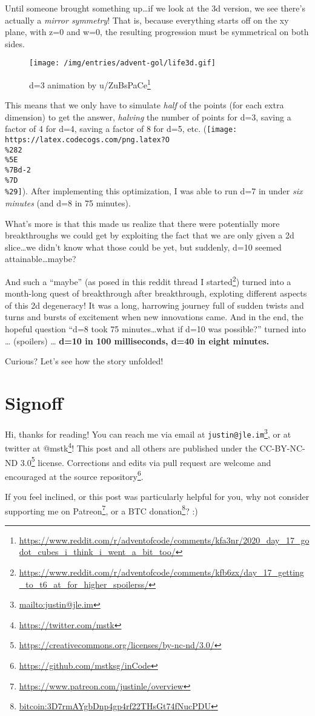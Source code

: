\documentclass[]{article}
\renewcommand{\href}[2]{#2\footnote{\url{#1}}}
\begin{document}
Until someone brought something up\ldots if we look at the 3d version, we see
there's actually a \emph{mirror symmetry}! That is, because everything starts
off on the xy plane, with z=0 and w=0, the resulting progression must be
symmetrical on both sides.

\begin{figure}
\centering
\texttt{[image: /img/entries/advent-gol/life3d.gif]}
\caption{d=3 animation by
\href{https://www.reddit.com/r/adventofcode/comments/kfa3nr/2020_day_17_godot_cubes_i_think_i_went_a_bit_too/}{u/ZuBsPaCe}}
\end{figure}

This means that we only have to simulate \emph{half} of the points (for each
extra dimension) to get the answer, \emph{halving} the number of points for d=3,
saving a factor of 4 for d=4, saving a factor of 8 for d=5, etc.
(\texttt{[image: https://latex.codecogs.com/png.latex?O\\\%282\\\%5E\\\%7Bd-2\\\%7D\\\%29]}).
After implementing this optimization, I was able to run d=7 in under \emph{six
minutes} (and d=8 in 75 minutes).

What's more is that this made us realize that there were potentially more
breakthroughs we could get by exploiting the fact that we are only given a 2d
slice\ldots we didn't know what those could be yet, but suddenly, d=10 seemed
attainable\ldots maybe?

And such a ``maybe'' (as posed in
\href{https://www.reddit.com/r/adventofcode/comments/kfb6zx/day_17_getting_to_t6_at_for_higher_spoilerss/}{this
reddit thread I started}) turned into a month-long quest of breakthrough after
breakthrough, exploting different aspects of this 2d degeneracy! It was a long,
harrowing journey full of sudden twists and turns and bursts of excitement when
new innovations came. And in the end, the hopeful question ``d=8 took 75
minutes\ldots what if d=10 was possible?'' turned into \ldots{} (spoilers)
\ldots{} \textbf{d=10 in 100 milliseconds, d=40 in eight minutes.}

Curious? Let's see how the story unfolded!

\hypertarget{signoff}{%
\section{Signoff}\label{signoff}}

Hi, thanks for reading! You can reach me via email at
\href{mailto:justin@jle.im}{\nolinkurl{justin@jle.im}}, or at twitter at
\href{https://twitter.com/mstk}{@mstk}! This post and all others are published
under the \href{https://creativecommons.org/licenses/by-nc-nd/3.0/}{CC-BY-NC-ND
3.0} license. Corrections and edits via pull request are welcome and encouraged
at \href{https://github.com/mstksg/inCode}{the source repository}.

If you feel inclined, or this post was particularly helpful for you, why not
consider \href{https://www.patreon.com/justinle/overview}{supporting me on
Patreon}, or a \href{bitcoin:3D7rmAYgbDnp4gp4rf22THsGt74fNucPDU}{BTC donation}?
:)
\end{document}
